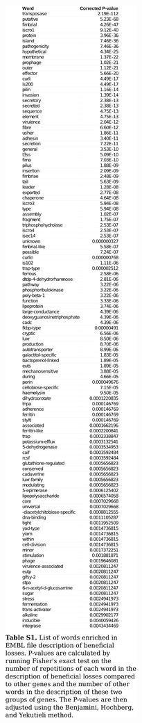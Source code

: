\documentclass{article}
\begin{document}
\begin{preview}
\includegraphics{suppl13.pdf}
\end{preview}
\end{document}
